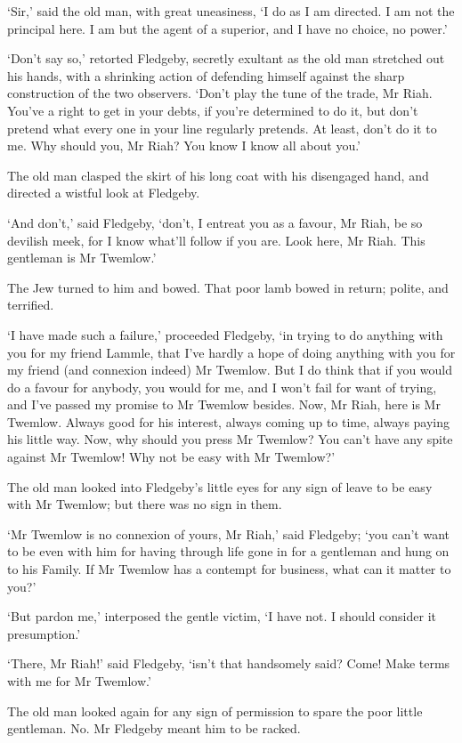 ‘Sir,’ said the old man, with great uneasiness, ‘I do as I am directed.
I am not the principal here. I am but the agent of a superior, and I
have no choice, no power.’

‘Don’t say so,’ retorted Fledgeby, secretly exultant as the old man
stretched out his hands, with a shrinking action of defending himself
against the sharp construction of the two observers. ‘Don’t play the
tune of the trade, Mr Riah. You’ve a right to get in your debts, if
you’re determined to do it, but don’t pretend what every one in your
line regularly pretends. At least, don’t do it to me. Why should you, Mr
Riah? You know I know all about you.’

The old man clasped the skirt of his long coat with his disengaged hand,
and directed a wistful look at Fledgeby.

‘And don’t,’ said Fledgeby, ‘don’t, I entreat you as a favour, Mr Riah,
be so devilish meek, for I know what’ll follow if you are. Look here, Mr
Riah. This gentleman is Mr Twemlow.’

The Jew turned to him and bowed. That poor lamb bowed in return; polite,
and terrified.

‘I have made such a failure,’ proceeded Fledgeby, ‘in trying to do
anything with you for my friend Lammle, that I’ve hardly a hope of doing
anything with you for my friend (and connexion indeed) Mr Twemlow. But
I do think that if you would do a favour for anybody, you would for me,
and I won’t fail for want of trying, and I’ve passed my promise to Mr
Twemlow besides. Now, Mr Riah, here is Mr Twemlow. Always good for his
interest, always coming up to time, always paying his little way. Now,
why should you press Mr Twemlow? You can’t have any spite against Mr
Twemlow! Why not be easy with Mr Twemlow?’

The old man looked into Fledgeby’s little eyes for any sign of leave to
be easy with Mr Twemlow; but there was no sign in them.

‘Mr Twemlow is no connexion of yours, Mr Riah,’ said Fledgeby; ‘you
can’t want to be even with him for having through life gone in for a
gentleman and hung on to his Family. If Mr Twemlow has a contempt for
business, what can it matter to you?’

‘But pardon me,’ interposed the gentle victim, ‘I have not. I should
consider it presumption.’

‘There, Mr Riah!’ said Fledgeby, ‘isn’t that handsomely said? Come! Make
terms with me for Mr Twemlow.’

The old man looked again for any sign of permission to spare the poor
little gentleman. No. Mr Fledgeby meant him to be racked.

